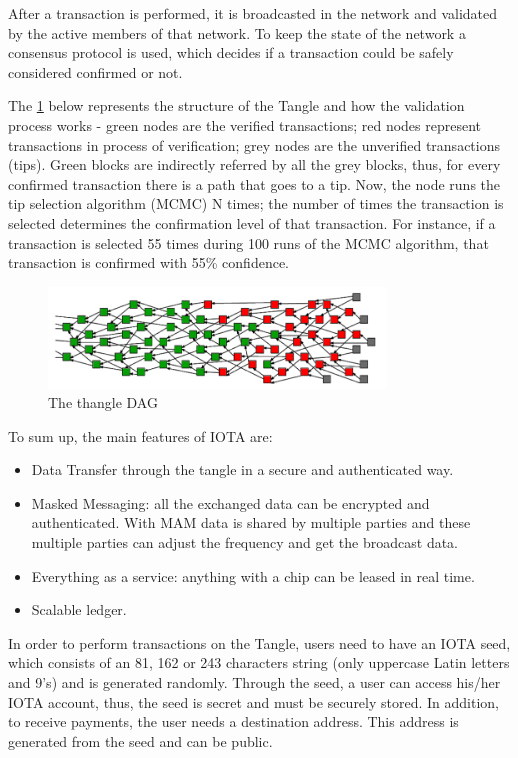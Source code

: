 After a transaction is performed, it is broadcasted in the network and validated by the active members of that network. To keep the state of the network a consensus protocol is used, which decides if a transaction could be safely considered confirmed or not. 

The \cref{fig:tangle} below represents the structure of the Tangle and how the validation process works - green nodes are the verified transactions; red nodes represent transactions in process of verification; grey nodes are the unverified transactions (tips).
Green blocks are indirectly referred by all the grey blocks, thus, for every confirmed transaction there is a path that goes to a tip. Now, the node runs the tip selection algorithm (\ac{MCMC}) N times; the number of times the transaction is selected determines the confirmation level of that transaction. For instance, if a transaction is selected 55 times during 100 runs of the \ac{MCMC} algorithm, that transaction is confirmed with 55\% confidence.



 \begin{figure}[h]
\centering
\includegraphics[width=0.8\textwidth]{./Images/tangle}
\caption{The thangle \ac{DAG}}
\label{fig:tangle}
\end{figure}


To sum up, the main features of IOTA are:
\begin{itemize}
    \item Data Transfer through the tangle in a secure and authenticated way.
    \item Masked Messaging: all the exchanged data can be encrypted and authenticated. With \ac{MAM} data is shared by multiple parties and these multiple parties can adjust the frequency and get the broadcast data.
    \item Everything as a service: anything with a chip can be leased in real time.
    \item Scalable ledger.
\end{itemize}


In order to perform transactions on the Tangle, users need to have an IOTA seed, which consists of an 81, 162 or 243 characters string (only uppercase Latin letters and 9’s) and is generated randomly. Through the seed, a user can access his/her IOTA account, thus, the seed is secret and must be securely stored. In addition, to receive payments, the user needs a destination address. This address is generated from the seed and can be public.


